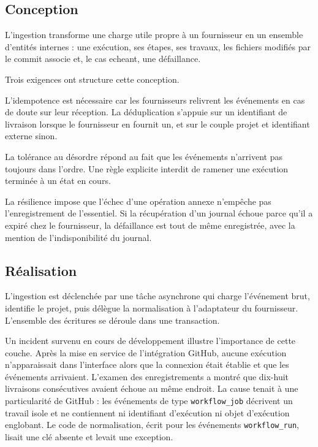 \documentclass[12pt,a4paper,oneside]{report}
\begin{document}
\subsection{Conception}

L'ingestion transforme une charge utile propre à un fournisseur en un ensemble
d'entités internes : une exécution, ses étapes, ses travaux, les fichiers
modifiés par le commit associe et, le cas echeant, une défaillance.

Trois exigences ont structure cette conception.

L'idempotence est nécessaire car les fournisseurs relivrent les événements en cas
de doute sur leur réception. La déduplication s'appuie sur un identifiant de
livraison lorsque le fournisseur en fournit un, et sur le couple projet et
identifiant externe sinon.

La tolérance au désordre répond au fait que les événements n'arrivent pas
toujours dans l'ordre. Une règle explicite interdit de ramener une exécution
terminée à un état en cours.

La résilience impose que l'échec d'une opération annexe n'empêche pas
l'enregistrement de l'essentiel. Si la récupération d'un journal échoue parce
qu'il a expiré chez le fournisseur, la défaillance est tout de même enregistrée,
avec la mention de l'indisponibilité du journal.

\subsection{Réalisation}

L'ingestion est déclenchée par une tâche asynchrone qui charge l'événement brut,
identifie le projet, puis délègue la normalisation à l'adaptateur du fournisseur.
L'ensemble des écritures se déroule dans une transaction.

Un incident survenu en cours de développement illustre l'importance de cette
couche. Après la mise en service de l'intégration GitHub, aucune exécution
n'apparaissait dans l'interface alors que la connexion était établie et que les
événements arrivaient. L'examen des enregistrements a montré que dix-huit
livraisons consécutives avaient échoue au même endroit. La cause tenait à une
particularité de GitHub : les événements de type \texttt{workflow\_job} décrivent
un travail isole et ne contiennent ni identifiant d'exécution ni objet
d'exécution englobant. Le code de normalisation, écrit pour les événements
\texttt{workflow\_run}, lisait une clé absente et levait une exception.
\end{document}
